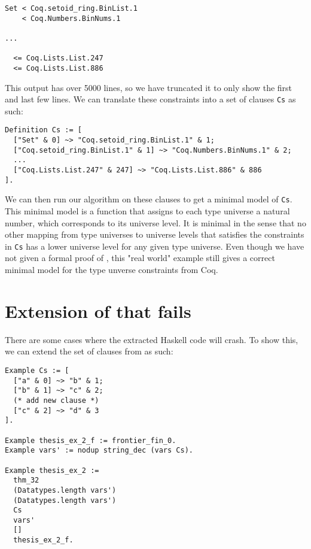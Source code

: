\begin{minipage}{\linewidth}
\begin{lstlisting}[language=Coq, label={lst:universe_hierarchy}, caption={Universe hierarchy in \lstinline{Main.v}}]
Set < Coq.setoid_ring.BinList.1
    < Coq.Numbers.BinNums.1

...

  <= Coq.Lists.List.247
  <= Coq.Lists.List.886
\end{lstlisting}
\end{minipage}

This output has over 5000 lines, so we have truncated it to only show the first and last few lines.
We can translate these constraints into a set of clauses \lstinline{Cs} as such:

\begin{minipage}{\linewidth}
\begin{lstlisting}[language=Coq, label={lst:universe_hierarchy_clauses}, caption={Universe hierarchy as clauses}]
Definition Cs := [
  ["Set" & 0] ~> "Coq.setoid_ring.BinList.1" & 1;
  ["Coq.setoid_ring.BinList.1" & 1] ~> "Coq.Numbers.BinNums.1" & 2;
  ...
  ["Coq.Lists.List.247" & 247] ~> "Coq.Lists.List.886" & 886
].
\end{lstlisting}
\end{minipage}

We can then run our algorithm on these clauses to get a minimal model of \lstinline{Cs}.
This minimal model is a function that assigns to each type universe a natural number,
which corresponds to its universe level. It is minimal in the sense that no other mapping from
type universes to universe levels that satisfies the constraints in \lstinline{Cs} has a lower
universe level for any given type universe.
Even though we have not given a formal proof of ,
this "real world" example still gives a correct minimal model for the type unverse constraints from Coq.

\section{Extension of  that fails}
\label{sec:limitations}

There are some cases where the extracted Haskell code will crash.
To show this, we can extend the set of clauses from  as such:

\begin{minipage}{\linewidth}
\begin{lstlisting}[language=Coq, label={lst:thm_32_coq_example_extended}, caption={\lstinline{thm_32} example extended}]
Example Cs := [
  ["a" & 0] ~> "b" & 1;
  ["b" & 1] ~> "c" & 2;
  (* add new clause *)
  ["c" & 2] ~> "d" & 3
].

Example thesis_ex_2_f := frontier_fin_0.
Example vars' := nodup string_dec (vars Cs).

Example thesis_ex_2 :=
  thm_32
  (Datatypes.length vars')
  (Datatypes.length vars')
  Cs
  vars'
  []
  thesis_ex_2_f.
\end{lstlisting}
\end{minipage}

